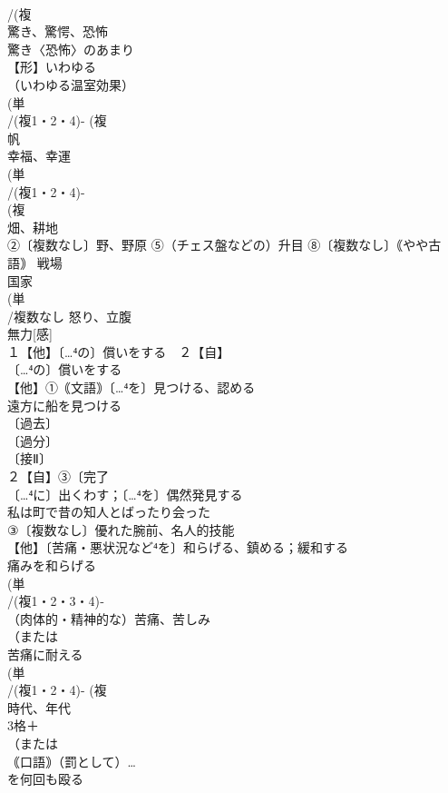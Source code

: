 \documentclass[8pt]{extreport}
\begin{document}
\begin{CJK}{UTF8}{min}
\\	/(複
\\	驚き、驚愕、恐怖 
\\	驚き〈恐怖〉のあまり 
\\	【形】いわゆる 
\\	（いわゆる温室効果）
\\	(単
\\	/(複1・2・4)- (複
\\	帆 
\\	幸福、幸運 
\\	(単
\\	/(複1・2・4)-
\\	(複
\\	畑、耕地 
\\	②〔複数なし〕野、野原 ⑤（チェス盤などの）升目 ⑧〔複数なし〕｟やや古語｠ 戦場 
\\	国家
\\	(単
\\	/複数なし 怒り、立腹 
\\	無力[感]
\\	１【他】〔…⁴の〕償いをする　２【自】
\\	〔…⁴の〕償いをする
\\	【他】①｟文語｠〔…⁴を〕見つける、認める 
\\	遠方に船を見つける
\\	〔過去〕
\\	〔過分〕
\\	〔接Ⅱ〕
\\	２【自】③〔完了
\\	〔…⁴に〕出くわす；〔…⁴を〕偶然発見する 
\\	私は町で昔の知人とばったり会った
\\	③〔複数なし〕優れた腕前、名人的技能
\\	【他】〔苦痛・悪状況など⁴を〕和らげる、鎮める；緩和する 
\\	痛みを和らげる
\\	(単
\\	/(複1・2・3・4)‐
\\	（肉体的・精神的な）苦痛、苦しみ 
\\	（または
\\	苦痛に耐える 
\\	(単
\\	/(複1・2・4)- (複
\\	時代、年代 
\\	3格＋
\\	（または
\\	｟口語｠（罰として）…
\\	を何回も殴る

\end{CJK}
\end{document}
